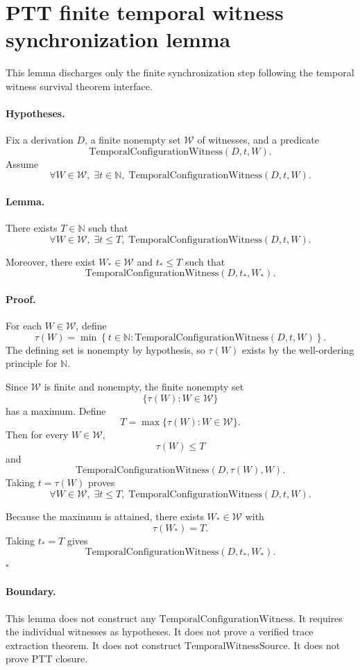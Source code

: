 \section*{PTT finite temporal witness synchronization lemma}

This lemma discharges only the finite synchronization step following the
temporal witness survival theorem interface.

\paragraph{Hypotheses.}
Fix a derivation \(D\), a finite nonempty set \(\mathcal W\) of witnesses,
and a predicate
\[
\mathrm{TemporalConfigurationWitness}(D,t,W).
\]
Assume
\[
\forall W\in\mathcal W,\;
\exists t\in\mathbb N,\;
\mathrm{TemporalConfigurationWitness}(D,t,W).
\]

\paragraph{Lemma.}
There exists \(T\in\mathbb N\) such that
\[
\forall W\in\mathcal W,\;
\exists t\leq T,\;
\mathrm{TemporalConfigurationWitness}(D,t,W).
\]

Moreover, there exist \(W_\ast\in\mathcal W\) and \(t_\ast\leq T\) such that
\[
\mathrm{TemporalConfigurationWitness}(D,t_\ast,W_\ast).
\]

\paragraph{Proof.}
For each \(W\in\mathcal W\), define
\[
\tau(W)
=
\min\left\{
t\in\mathbb N:
\mathrm{TemporalConfigurationWitness}(D,t,W)
\right\}.
\]
The defining set is nonempty by hypothesis, so \(\tau(W)\) exists by the
well-ordering principle for \(\mathbb N\).

Since \(\mathcal W\) is finite and nonempty, the finite nonempty set
\[
\{\tau(W):W\in\mathcal W\}
\]
has a maximum. Define
\[
T=\max\{\tau(W):W\in\mathcal W\}.
\]
Then for every \(W\in\mathcal W\),
\[
\tau(W)\leq T
\]
and
\[
\mathrm{TemporalConfigurationWitness}(D,\tau(W),W).
\]
Taking \(t=\tau(W)\) proves
\[
\forall W\in\mathcal W,\;
\exists t\leq T,\;
\mathrm{TemporalConfigurationWitness}(D,t,W).
\]

Because the maximum is attained, there exists \(W_\ast\in\mathcal W\) with
\[
\tau(W_\ast)=T.
\]
Taking \(t_\ast=T\) gives
\[
\mathrm{TemporalConfigurationWitness}(D,t_\ast,W_\ast).
\]
\(\square\)

\paragraph{Boundary.}
This lemma does not construct any
\(\mathrm{TemporalConfigurationWitness}\).
It requires the individual witnesses as hypotheses.
It does not prove a verified trace extraction theorem.
It does not construct \(\mathrm{TemporalWitnessSource}\).
It does not prove PTT closure.
